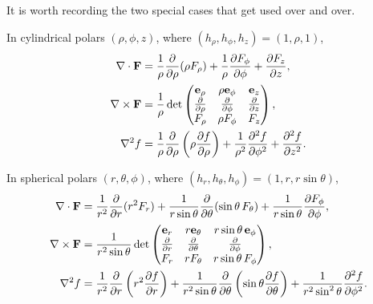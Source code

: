 \documentclass[a4paper]{scrartcl}
\begin{document}
It is worth recording the two special cases that get used over and over.

\begin{example}
	In cylindrical polars $(\rho, \phi, z)$, where $(h_\rho, h_\phi, h_z) = (1, \rho, 1)$,
	\begin{align*}
		\nabla \cdot \mathbf{F} &= \frac{1}{\rho} \frac{\partial}{\partial \rho}(\rho F_\rho) + \frac{1}{\rho}\frac{\partial F_\phi}{\partial \phi} + \frac{\partial F_z}{\partial z}, \\
		\nabla \times \mathbf{F} &= \frac{1}{\rho} \det \begin{pmatrix}
			\mathbf{e}_\rho & \rho \mathbf{e}_\phi & \mathbf{e}_z \\
			\frac{\partial}{\partial \rho} & \frac{\partial}{\partial \phi} & \frac{\partial}{\partial z} \\
			F_\rho & \rho F_\phi & F_z
		\end{pmatrix}, \\
		\nabla^2 f &= \frac{1}{\rho}\frac{\partial}{\partial \rho}\left(\rho \frac{\partial f}{\partial \rho}\right) + \frac{1}{\rho^2}\frac{\partial^2 f}{\partial \phi^2} + \frac{\partial^2 f}{\partial z^2}.
	\end{align*}
\end{example}

\begin{example}
	In spherical polars $(r, \theta, \phi)$, where $(h_r, h_\theta, h_\phi) = (1, r, r \sin \theta)$,
	\begin{align*}
		\nabla \cdot \mathbf{F} &= \frac{1}{r^2} \frac{\partial}{\partial r}(r^2 F_r) + \frac{1}{r \sin \theta} \frac{\partial}{\partial \theta}(\sin \theta \, F_\theta) + \frac{1}{r \sin \theta} \frac{\partial F_\phi}{\partial \phi}, \\
		\nabla \times \mathbf{F} &= \frac{1}{r^2 \sin \theta} \det \begin{pmatrix}
			\mathbf{e}_r & r \mathbf{e}_\theta & r \sin \theta \, \mathbf{e}_\phi \\
			\frac{\partial}{\partial r} & \frac{\partial}{\partial \theta} & \frac{\partial}{\partial \phi} \\
			F_r & r F_\theta & r \sin \theta \, F_\phi
		\end{pmatrix}, \\
		\nabla^2 f &= \frac{1}{r^2}\frac{\partial}{\partial r}\left(r^2 \frac{\partial f}{\partial r}\right) + \frac{1}{r^2 \sin \theta} \frac{\partial}{\partial \theta}\left(\sin \theta \frac{\partial f}{\partial \theta}\right) + \frac{1}{r^2 \sin^2\theta} \frac{\partial^2 f}{\partial \phi^2}.
	\end{align*}
\end{example}
\end{document}
